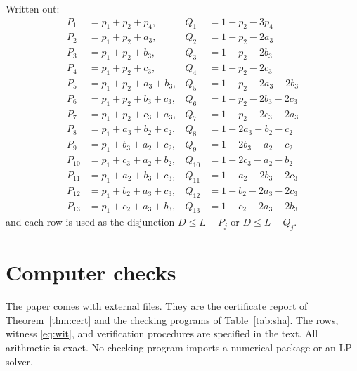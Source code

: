 \documentclass{amsart}
\theoremstyle{definition}
\theoremstyle{plain}
\numberwithin{equation}{section}
\numberwithin{table}{section}
\begin{document}
Written out:
\begin{align}
 P_1&=p_1+p_2+p_4,& Q_1&=1-p_2-3p_4
 \tag{G1}\label{eq:G1}\\
 P_2&=p_1+p_2+a_3,& Q_2&=1-p_2-2a_3
 \tag{G2}\label{eq:G2}\\
 P_3&=p_1+p_2+b_3,& Q_3&=1-p_2-2b_3
 \tag{G3}\label{eq:G3}\\
 P_4&=p_1+p_2+c_3,& Q_4&=1-p_2-2c_3
 \tag{G4}\label{eq:G4}\\
 P_5&=p_1+p_2+a_3+b_3,& Q_5&=1-p_2-2a_3-2b_3
 \tag{G5}\label{eq:G5}\\
 P_6&=p_1+p_2+b_3+c_3,& Q_6&=1-p_2-2b_3-2c_3
 \tag{G6}\label{eq:G6}\\
 P_7&=p_1+p_2+c_3+a_3,& Q_7&=1-p_2-2c_3-2a_3
 \tag{G7}\label{eq:G7}\\
 P_8&=p_1+a_3+b_2+c_2,& Q_8&=1-2a_3-b_2-c_2
 \tag{G8}\label{eq:G8}\\
 P_9&=p_1+b_3+a_2+c_2,& Q_9&=1-2b_3-a_2-c_2
 \tag{G9}\label{eq:G9}\\
 P_{10}&=p_1+c_3+a_2+b_2,& Q_{10}&=1-2c_3-a_2-b_2
 \tag{G10}\label{eq:G10}\\
 P_{11}&=p_1+a_2+b_3+c_3,& Q_{11}&=1-a_2-2b_3-2c_3
 \tag{G11}\label{eq:G11}\\
 P_{12}&=p_1+b_2+a_3+c_3,& Q_{12}&=1-b_2-2a_3-2c_3
 \tag{G12}\label{eq:G12}\\
 P_{13}&=p_1+c_2+a_3+b_3,& Q_{13}&=1-c_2-2a_3-2b_3
 \tag{G13}\label{eq:G13}
\end{align}
and each row is used as the disjunction
$D\le L-P_j$ or $D\le L-Q_j$.


\section{Computer checks}\label{app:ver}

The paper comes with external files. They are the certificate report of
Theorem~\ref{thm:cert} and the
checking programs of Table~\ref{tab:sha}. The rows, witness
\eqref{eq:wit}, and verification procedures are specified in the text. All
arithmetic is exact. No checking program imports a numerical package or an
LP solver.
\end{document}
